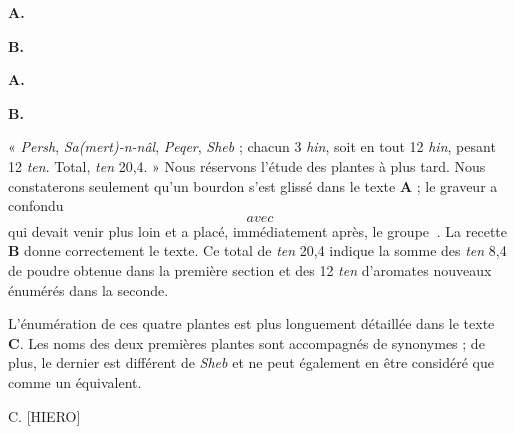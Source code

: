 \documentclass[a4paper, 11pt, oneside, landscape]{article}
\newcommand*\hieroAAAR{}
\newcommand*\hieroAABT{}
\newcommand*\hieroAAEH{\raisebox{0.5ex}{}}
\newcommand*\hieroAAFO{\raisebox{0.5ex}{}}
\newcommand*\hieroAAFT{}
\newcommand*\hieroAAGA{}
\newcommand*\hieroAAGD{}
\newcommand*\hieroAAGN{}
\newcommand*\hieroAAHX{}
\newcommand*\hieroAAIT{}
\newcommand*\hieroAAIU{}
\newcommand*\hieroAAJH{}
\newcommand*\hieroAAKW{}
\newcommand*\hieroAAKX{}
\newcommand*\hieroAAKY{}
\newcommand*\hieroAAKZ{}
\newcommand*\hieroAALA{}
\newcommand*\hieroAALB{}
\newcommand*\hieroAALC{}
\newcommand*\hieroAALD{}
\newcommand*\hieroAALE{}
\newcommand*\hieroAALF{}
\newcommand*\hieroAALG{}
\newcommand*\hieroAALH{}
\newcommand*\hieroAALI{}
\newcommand*\hieroAALJ{}
\newcommand*\hieroAAMQ{}
\begin{document}
\hspace*{10mm}\textbf{A.}\hspace*{5mm} $\hieroAAKW\:\hieroAAAR\:\hieroAAKX$ \hspace*{5mm} $\hieroAAKY\:\hieroAAKZ\:\hieroAAKX$ \hspace*{7.2mm} $\hieroAALA\:\hieroAAAR\:\hieroAAKX$ \hspace*{5mm} $\hieroAALB\:\hieroAAAR\:\hieroAAKX$

\hspace*{10mm}\textbf{B.}\hspace*{5mm} $\hieroAALC\:\hieroAAFO\:\hieroAALD$ \hspace*{6mm} $\hieroAALE\:\hieroAAEH\:\hieroAALF\:\hieroAAGD\:\hieroAABT\:\hieroAAKX$ \hspace*{1mm} $\hieroAALA\:\hieroAAGD\:\hieroAAKX$ \hspace*{5mm} $\hieroAAHX\:\hieroAAFO\:\hieroAAKX$

\hspace*{10mm}\textbf{A.}\hspace*{5mm} $\hieroAALG\:\hieroAAIU$ \hspace*{15mm} $\hieroAAIT\:\hieroAAIU\:\hieroAAGA\:\hieroAAJH$

\hspace*{10mm}\textbf{B.}\hspace*{5mm} $\hieroAALG\:\hieroAAIU\:\hieroAAGN\:\hieroAAFT\:\hieroAAIU\:\hieroAAGN\:\hieroAAFT\:\hieroAAMQ\:\hieroAAGA\:\hieroAALH$

« \emph{Persh}, \emph{Sa(mert)-n-nâl}, \emph{Peqer}, \emph{Sheb} ; chacun 3 \emph{hin}, soit en tout 12 \emph{hin}, pesant 12 \emph{ten}. Total, \emph{ten} 20,4. » Nous réservons l'étude des plantes à plus tard. Nous constaterons seulement qu'un bourdon s'est glissé dans le texte \textbf{A} ; le graveur a confondu $\hieroAALI$ avec $\hieroAALJ$ qui devait venir plus loin et a placé, immédiatement après, le groupe $\hieroAAGA\:\hieroAAJH$. La recette \textbf{B} donne correctement le texte. Ce total de \emph{ten} 20,4 indique la somme des \emph{ten} 8,4 de poudre obtenue dans la première section et des 12 \emph{ten} d'aromates nouveaux énumérés dans la seconde.

L'énumération de ces quatre plantes est plus longuement détaillée dans le texte \textbf{C}. Les noms des deux premières plantes sont accompagnés de synonymes ; de plus, le dernier est différent de \emph{Sheb} et ne peut également en être considéré que comme un équivalent.

C. [HIERO]
\end{document}

